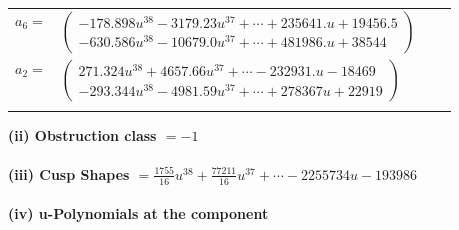 \documentclass[1p]{elsarticle_modified}
\theoremstyle{definition}
\begin{document}
\begin{tabular}{m{7pt} m{180pt} m{7pt} m{180pt} }
\flushright $a_{6}=$&$\begin{pmatrix}-178.898 u^{38}-3179.23 u^{37}+\cdots+235641. u+19456.5\\-630.586 u^{38}-10679.0 u^{37}+\cdots+481986. u+38544\end{pmatrix}$ \\
\flushright $a_{2}=$&$\begin{pmatrix}271.324 u^{38}+4657.66 u^{37}+\cdots-232931. u-18469\\-293.344 u^{38}-4981.59 u^{37}+\cdots+278367 u+22919\end{pmatrix}$\\&\end{tabular}
\flushleft \textbf{(ii) Obstruction class $= -1$}\\~\\
\flushleft \textbf{(iii) Cusp Shapes $= \frac{1755}{16} u^{38}+\frac{77211}{16} u^{37}+\cdots-2255734 u-193986$}\\~\\
\newpage\renewcommand{\arraystretch}{1}
\flushleft \textbf{(iv) u-Polynomials at the component}\newline \\
\end{document}
